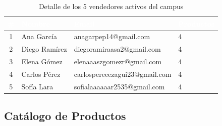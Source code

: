 \documentclass[12pt, a4paper]{article}
\begin{document}
\begin{table}[H]
\centering
\caption{Detalle de los 5 vendedores activos del campus}
\begin{tabular}{c l l l}
\toprule
\rowcolor{tableheader}
\textcolor{white}{\textbf{\#}} & \textcolor{white}{\textbf{Nombre}} & \textcolor{white}{\textbf{Email}} & \textcolor{white}{\textbf{Productos}} \\
\midrule
1 & Ana García & anagarpep14@gmail.com & 4 \\
\rowcolor{rowalt}
2 & Diego Ramírez & diegoramiraasa2@gmail.com & 4 \\
3 & Elena Gómez & elenaaaszgomezr@gmail.com & 4 \\
\rowcolor{rowalt}
4 & Carlos Pérez & carlospereeezagui23@gmail.com & 4 \\
5 & Sofía Lara & sofialaaaaaar2535@gmail.com & 4 \\
\bottomrule
\end{tabular}
\end{table}

\subsection{Catálogo de Productos}
\end{document}
